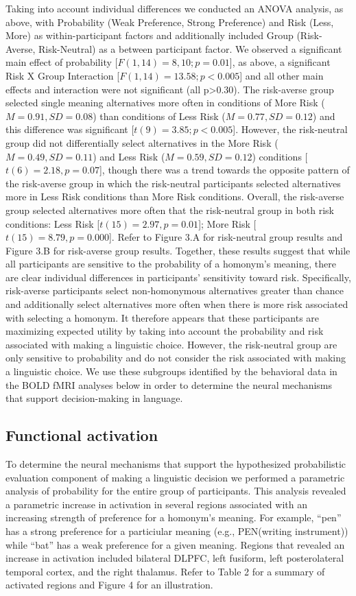 \documentclass[final,authoryear,5p,times,twocolumn]{elsarticle}
\begin{document}
Taking into account individual differences we conducted an ANOVA analysis, as above, with Probability (Weak Preference, Strong Preference) and Risk (Less, More) as within-participant factors and additionally included Group (Risk-Averse, Risk-Neutral) as a between participant factor.  We observed a significant main effect of probability [$F(1,14)=8,10; p=0.01$], as above, a significant Risk X Group Interaction [$F(1,14)=13.58; p<0.005$] and all other main effects and interaction were not significant (all p>0.30).  The risk-averse group selected single meaning alternatives more often in conditions of More Risk ($M=0.91, SD=0.08$) than conditions of Less Risk ($M=0.77, SD=0.12$) and this difference was significant [$t(9)=3.85; p<0.005$].  However, the risk-neutral group did not differentially select alternatives in the More Risk ($M=0.49, SD=0.11$) and Less Risk ($M=0.59, SD=0.12$) conditions [$t(6)=2.18, p=0.07$], though there was a trend towards the opposite pattern of the risk-averse group in which the risk-neutral participants selected alternatives more in Less Risk conditions than More Risk conditions.  Overall, the risk-averse group selected alternatives more often that the risk-neutral group in both risk conditions: Less Risk [$t(15)=2.97, p=0.01$]; More Risk [$t(15)=8.79, p=0.000$].  Refer to Figure 3.A for risk-neutral group results and Figure 3.B for risk-averse group results.
Together, these results suggest that while all participants are sensitive to the probability of a homonym’s meaning, there are clear individual differences in participants’ sensitivity toward risk.  Specifically, risk-averse participants select non-homonymous alternatives greater than chance and additionally select alternatives more often when there is more risk associated with selecting a homonym.  It therefore appears that these participants are maximizing expected utility by taking into account the probability and risk associated with making a linguistic choice.  However, the risk-neutral group are only sensitive to probability and do not consider the risk associated with making a linguistic choice.  We use these subgroups identified by the behavioral data in the BOLD fMRI analyses below in order to determine the neural mechanisms that support decision-making in language.

\subsection{Functional activation}
To determine the neural mechanisms that support the hypothesized probabilistic evaluation component of making a linguistic decision we performed a parametric analysis of probability for the entire group of participants.  This analysis revealed a parametric increase in activation in several regions associated with an increasing strength of preference for a homonym’s meaning.  For example, “pen” has  a strong preference for a particiular meaning (e.g., PEN(writing instrument)) while “bat” has a weak preference for a given meaning.  Regions that revealed an increase in activation included bilateral DLPFC, left fusiform, left posterolateral temporal cortex, and the right thalamus.  Refer to Table 2 for a summary of activated regions and Figure 4 for an illustration.
\end{document}
